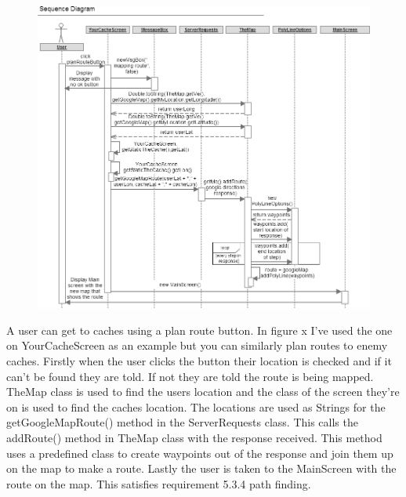 \newpage
\begin{figure}
    \centering
    \includegraphics[width=\textwidth]{images/sequence/getRoute}
\end{figure}

A user can get to caches using a plan route button. In figure x I've used the one on YourCacheScreen as an example but you can similarly plan routes to enemy caches. Firstly when the user clicks the button their location is checked and if it can't be found they are told. If not they are told the route is being mapped. TheMap class is used to find the users location and the class of the screen they're on is used to find the caches location. The locations are used as Strings for the getGoogleMapRoute() method in the ServerRequests class. This calls the addRoute() method in TheMap class with the response received. This method uses a predefined class to create waypoints out of the response and join them up on the map to make a route. Lastly the user is taken to the MainScreen with the route on the map. This satisfies requirement 5.3.4 path finding.

